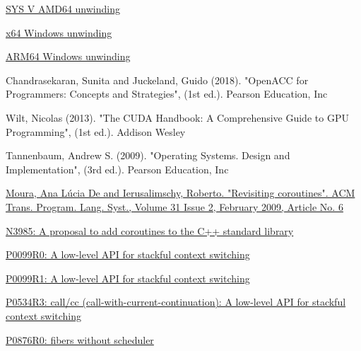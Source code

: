 \newpage
{}
\begin{thebibliography}{99}

        \href{https://software.intel.com/sites/default/files/article/402129/mpx-linux64-abi.pdf}{SYS V AMD64 unwinding}

        \href{https://docs.microsoft.com/en-us/cpp/build/exception-handling-x64?view=vs-2019}{x64 Windows unwinding}

        \href{https://docs.microsoft.com/en-us/cpp/build/arm64-exception-handling?view=vs-2019}{ARM64 Windows unwinding}

        {Chandrasekaran, Sunita and Juckeland, Guido (2018). "OpenACC for Programmers: Concepts and Strategies", (1st ed.).
         Pearson Education, Inc}

        {Wilt, Nicolas (2013). "The CUDA Handbook: A Comprehensive Guide to GPU Programming", (1st ed.).
         Addison Wesley}

        {Tannenbaum, Andrew S. (2009). "Operating Systems. Design and Implementation", (3rd ed.).
         Pearson Education, Inc}

        \href{http://www.inf.puc-rio.br/~roberto/docs/MCC15-04.pdf}
        {Moura, Ana L\'{u}cia De and Ierusalimschy, Roberto. "Revisiting coroutines".
         ACM Trans. Program. Lang. Syst., Volume 31 Issue 2, February 2009, Article No. 6}

        \href{http://isocpp.org/files/papers/n3985.pdf}
        {N3985: A proposal to add coroutines to the C++ standard library}

        \href{http://www.open-std.org/jtc1/sc22/wg21/docs/papers/2015/p0099r0.pdf}
        {P0099R0: A low-level API for stackful context switching}

        \href{http://www.open-std.org/jtc1/sc22/wg21/docs/papers/2016/p0099r1.pdf}
        {P0099R1: A low-level API for stackful context switching}

        \href{http://www.open-std.org/jtc1/sc22/wg21/docs/papers/2017/p0534r3.pdf}
        {P0534R3: call/cc (call-with-current-continuation): A low-level API for stackful
        context switching}

        \href{http://www.open-std.org/jtc1/sc22/wg21/docs/papers/2018/p0876r0.pdf}
        {P0876R0: fibers without scheduler}


\end{thebibliography}
